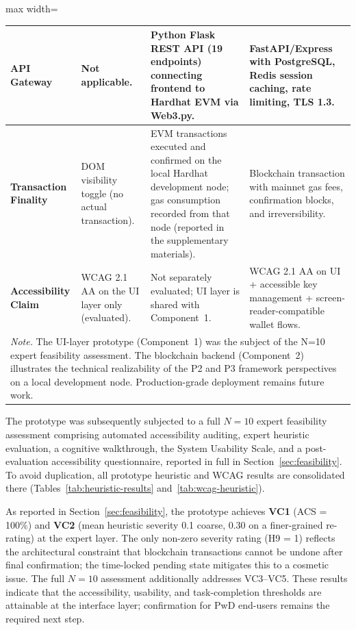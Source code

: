 \documentclass[journal,onecolumn]{IEEEtran}
\begin{document}
\begin{table}[htbp]
\begin{adjustbox}{max width=\columnwidth}
\begin{tabular}{|p{2.8cm}|p{3.8cm}|p{3.8cm}|p{3.8cm}|}
\hline
\textbf{API Gateway} & Not applicable. & Python Flask REST API (19 endpoints) connecting frontend to Hardhat EVM via Web3.py. & FastAPI/Express with PostgreSQL, Redis session caching, rate limiting, TLS 1.3. \\
\hline
\textbf{Transaction Finality} & DOM visibility toggle (no actual transaction). & EVM transactions executed and confirmed on the local Hardhat development node; gas consumption recorded from that node (reported in the supplementary materials). & Blockchain transaction with mainnet gas fees, confirmation blocks, and irreversibility. \\
\hline
\textbf{Accessibility Claim} & WCAG 2.1 AA on the UI layer only (evaluated). & Not separately evaluated; UI layer is shared with Component~1. & WCAG 2.1 AA on UI + accessible key management + screen-reader-compatible wallet flows. \\
\hline
\multicolumn{4}{|p{11.4cm}|}{\footnotesize\textit{Note.} The UI-layer prototype (Component~1) was the subject of the N=10 expert feasibility assessment. The blockchain backend (Component~2) illustrates the technical realizability of the P2 and P3 framework perspectives on a local development node. Production-grade deployment remains future work.} \\
\hline
\end{tabular}
\end{adjustbox}
\end{table}

The prototype was subsequently subjected to a full $N=10$ expert feasibility assessment comprising automated accessibility auditing, expert heuristic evaluation, a cognitive walkthrough, the System Usability Scale, and a post-evaluation accessibility questionnaire, reported in full in Section~\ref{sec:feasibility}. To avoid duplication, all prototype heuristic and WCAG results are consolidated there (Tables~\ref{tab:heuristic-results} and~\ref{tab:wcag-heuristic}).

As reported in Section~\ref{sec:feasibility}, the prototype achieves \textbf{VC1} (ACS = 100\%) and \textbf{VC2} (mean heuristic severity 0.1 coarse, 0.30 on a finer-grained re-rating) at the expert layer. The only non-zero severity rating (H9 = 1) reflects the architectural constraint that blockchain transactions cannot be undone after final confirmation; the time-locked pending state mitigates this to a cosmetic issue. The full $N=10$ assessment additionally addresses VC3--VC5. These results indicate that the accessibility, usability, and task-completion thresholds are attainable at the interface layer; confirmation for PwD end-users remains the required next step.
\end{document}
